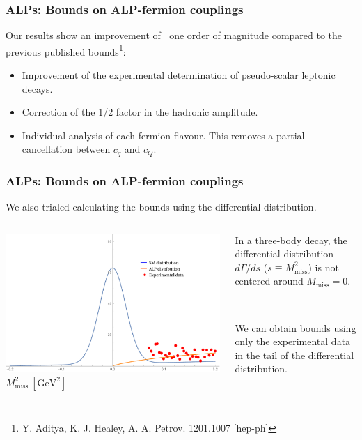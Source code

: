 \documentclass[mathserif, 10pt]{beamer}
\begin{document}
\begin{frame}\frametitle{ALPs: Bounds on ALP-fermion couplings}
    Our results show an improvement of $~$ one order of magnitude compared to the previous published bounds\footnote[19]{Y. Aditya, K. J. Healey, A. A. Petrov. 1201.1007 [hep-ph]}:
    \begin{itemize}
        \item Improvement of the experimental determination of pseudo-scalar leptonic decays.
        \item Correction of the 1/2 factor in the hadronic amplitude.
        \item Individual analysis of each fermion flavour. This removes a partial cancellation between $c_q$ and $c_Q$.
    \end{itemize}
\end{frame}

\begin{frame}
    \frametitle{ALPs: Bounds on ALP-fermion couplings}
    We also trialed calculating the bounds using the differential distribution.
    \begin{columns}
        \begin{column}{0.6\textwidth}
            \center
            \includegraphics[width=\columnwidth]{figures/distr}
            {\small $M_\mathrm{miss}^2\ [\mathrm{GeV}^2]$}
        \end{column}
        \begin{column}{0.4\textwidth}
            In a three-body decay, the differential distribution $d\Gamma/d s$ ($s \equiv M_\mathrm{miss}^2$) is not centered around $M_\mathrm{miss}=0$.

            ~

            We can obtain bounds using only the experimental data in the tail of the differential distribution.
        \end{column}
    \end{columns}
\end{frame}
\end{document}
